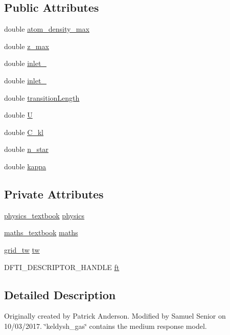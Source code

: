 \subsection*{Public Attributes}
\begin{DoxyCompactItemize}
\item 
double \hyperlink{classkeldysh__gas_a287e2c7a3081d8b65ba126288a3174bd}{atom\+\_\+density\+\_\+max}
\item 
double \hyperlink{classkeldysh__gas_a117691dd8b6fd06b34a73392c0e73e32}{z\+\_\+max}
\item 
double \hyperlink{classkeldysh__gas_ab0dee35b9ad45af3fca4a2079389e632}{inlet\+\_}
\item 
double \hyperlink{classkeldysh__gas_a685d93a796afba55c6fcd6d61c7e2bf8}{inlet\+\_}
\item 
double \hyperlink{classkeldysh__gas_a88f63ff18217c60729a67b10ee838ee4}{transition\+Length}
\item 
double \hyperlink{classkeldysh__gas_a752b70afe289a798cc0ab7b688b9ed3d}{U}
\item 
double \hyperlink{classkeldysh__gas_a7a66e438ff78b240fe419c0a426b1648}{C\+\_\+kl}
\item 
double \hyperlink{classkeldysh__gas_a22ba35c494b37c8a8e78db09d6d8748c}{n\+\_\+star}
\item 
double \hyperlink{classkeldysh__gas_a836c6a6c2f1bec80ea15344822a07ea5}{kappa}
\end{DoxyCompactItemize}
\subsection*{Private Attributes}
\begin{DoxyCompactItemize}
\item 
\hyperlink{classphysics__textbook}{physics\+\_\+textbook} \hyperlink{classkeldysh__gas_a3b26e27ccf042ae2f89aa23e4252acf4}{physics}
\item 
\hyperlink{classmaths__textbook}{maths\+\_\+textbook} \hyperlink{classkeldysh__gas_a501614b541b9056bb05b378a39962524}{maths}
\item 
\hyperlink{classgrid__tw}{grid\+\_\+tw} \hyperlink{classkeldysh__gas_a1cd7129f9ba9d62f4084049e529cab49}{tw}
\item 
D\+F\+T\+I\+\_\+\+D\+E\+S\+C\+R\+I\+P\+T\+O\+R\+\_\+\+H\+A\+N\+D\+LE \hyperlink{classkeldysh__gas_ac635d55dcbdfcde7c34d77de5cd75af6}{ft}
\end{DoxyCompactItemize}


\subsection{Detailed Description}
Originally created by Patrick Anderson. Modified by Samuel Senior on 10/03/2017. \char`\"{}keldysh\+\_\+gas\char`\"{} contains the medium response model. 


